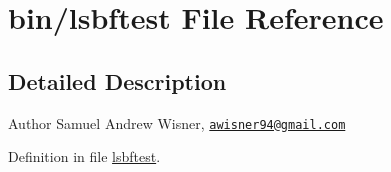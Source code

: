 \hypertarget{lsbftest}{\section{bin/lsbftest File Reference}
\label{lsbftest}
}


\subsection{Detailed Description}
\begin{DoxyAuthor}{Author}
Samuel Andrew Wisner, \href{mailto:awisner94@gmail.com}{\tt awisner94@gmail.\+com} 
\end{DoxyAuthor}


Definition in file \hyperlink{lsbftest_source}{lsbftest}.

